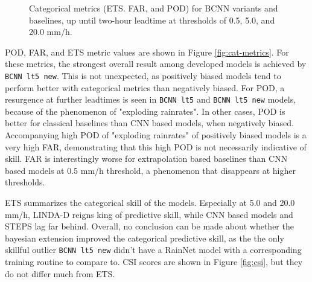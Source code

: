 \begin{figure}[H]
	\caption{Categorical metrics (ETS. FAR, and POD) for BCNN variants and baselines, up until two-hour leadtime at thresholds of 0.5, 5.0, and 20.0 mm/h.}
\end{figure}

POD, FAR, and ETS metric values are shown in Figure \ref{fig:cat-metrics}. For these metrics, the strongest overall result among developed models is achieved by \texttt{BCNN lt5 new}. This is not unexpected, as positively biased models tend to perform better with categorical metrics than negatively biased. For POD, a resurgence at further leadtimes is seen in \texttt{BCNN lt5} and \texttt{BCNN lt5 new} models, because of the phenomenon of "exploding rainrates".  In other cases, POD is better for classical baselines than CNN based models, when negatively biased. Accompanying high POD of "exploding rainrates" of positively biased models is a very high FAR, demonstrating that this high POD is not necessarily indicative of skill. FAR is interestingly worse for extrapolation based baselines than CNN based models at 0.5 mm/h threshold, a phenomenon that disappears at higher thresholds.

 ETS summarizes the categorical skill of the models. Especially at 5.0 and 20.0 mm/h, LINDA-D reigns king of predictive skill, while CNN based models and STEPS lag far behind. Overall, no conclusion can be made about whether the bayesian extension improved the categorical predictive skill, as the the only skillful outlier \texttt{BCNN lt5 new} didn't have a RainNet model with a corresponding training routine to compare to. CSI scores are shown in Figure \ref{fig:csi}, but they do not differ much from ETS. 

